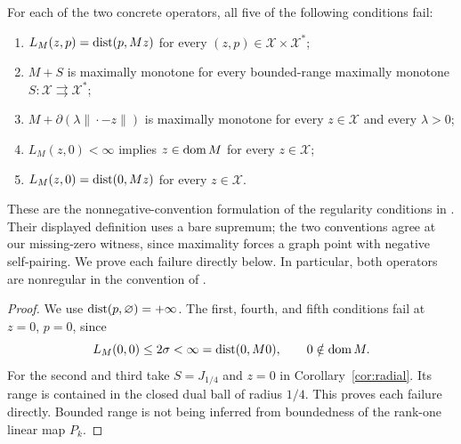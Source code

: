 \begin{corollary}\label{cor:regularity}
For each of the two concrete operators, all five of the following
conditions fail:
\begin{enumerate}
\item $L_M(z,p)=\operatorname{dist}(p,Mz)$ for every $(z,p)\in\mathcal X\times\mathcal X^*$;
\item $M+S$ is maximally monotone for every bounded-range maximally
monotone $S:\mathcal X\rightrightarrows\mathcal X^*$;
\item $M+\partial(\lambda\|\cdot-z\|)$ is maximally monotone for every
$z\in\mathcal X$ and every $\lambda>0$;
\item $L_M(z,0)<\infty$ implies $z\in\operatorname{dom} M$ for every $z\in\mathcal X$;
\item $L_M(z,0)=\operatorname{dist}(0,Mz)$ for every $z\in\mathcal X$.
\end{enumerate}
These are the nonnegative-convention formulation of the regularity
conditions in \cite[Theorem~2.3]{verona2012}. Their displayed definition
uses a bare supremum; the two conventions agree at our missing-zero
witness, since maximality forces a graph point with negative self-pairing.
We prove each failure directly below. In particular, both operators are
nonregular in the convention of \cite{verona2008}.
\end{corollary}
\begin{proof}
We use $\operatorname{dist}(p,\varnothing)=+\infty$. The first, fourth, and fifth
conditions fail at $z=0$, $p=0$, since
\[
L_M(0,0)\le2\sigma<\infty=\operatorname{dist}(0,M0),\qquad 0\notin\operatorname{dom} M.
\]
For the second and third take $S=J_{1/4}$ and $z=0$ in
Corollary~\ref{cor:radial}. Its range is contained in the closed dual
ball of radius $1/4$. This proves each failure directly. Bounded range
is not being inferred from boundedness of the rank-one linear map $P_k$.
\end{proof}

